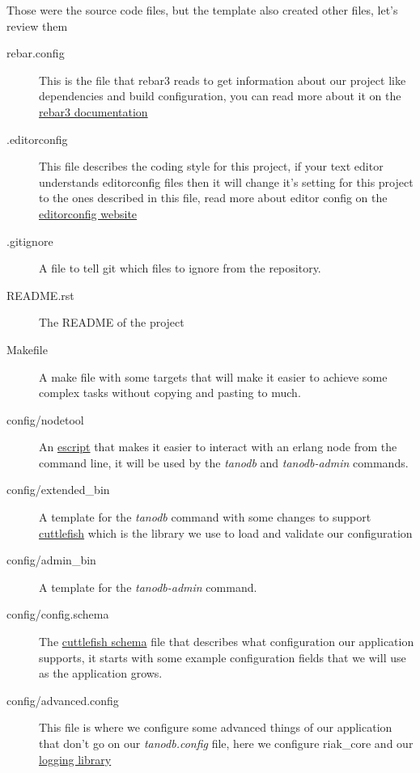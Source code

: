 \documentclass[letterpaper,10pt,english]{sphinxmanual}
\begin{document}
Those were the source code files, but the template also created other files,
let's review them
\begin{description}
\item[{rebar.config}] \leavevmode
This is the file that rebar3 reads to get information about our project
like dependencies and build configuration, you can read more about it
on the \href{http://www.rebar3.org/docs/basic-usage}{rebar3 documentation}

\item[{.editorconfig}] \leavevmode
This file describes the coding style for this project, if your text editor
understands editorconfig files then it will change it's setting for this
project to the ones described in this file, read more about editor config
on the \href{http://editorconfig.org/}{editorconfig website}

\item[{.gitignore}] \leavevmode
A file to tell git which files to ignore from the repository.

\item[{README.rst}] \leavevmode
The README of the project

\item[{Makefile}] \leavevmode
A make file with some targets that will make it easier to achieve some
complex tasks without copying and pasting to much.

\item[{config/nodetool}] \leavevmode
An \href{http://www.erlang.org/doc/man/escript.html}{escript} that makes it
easier to interact with an erlang node from the command line, it will be
used by the \emph{tanodb} and \emph{tanodb-admin} commands.

\item[{config/extended\_bin}] \leavevmode
A template for the \emph{tanodb} command with some changes to support \href{https://github.com/basho/cuttlefish}{cuttlefish}
which is the library we use to load and validate our configuration

\item[{config/admin\_bin}] \leavevmode
A template for the \emph{tanodb-admin} command.

\item[{config/config.schema}] \leavevmode
The \href{https://github.com/basho/cuttlefish/wiki}{cuttlefish schema} file
that describes what configuration our application supports, it starts with
some example configuration fields that we will
use as the application grows.

\item[{config/advanced.config}] \leavevmode
This file is where we configure some advanced things of our application
that don't go on our \emph{tanodb.config} file, here we configure riak\_core and
our \href{https://github.com/basho/lager/}{logging library}


\end{description}
\end{document}
